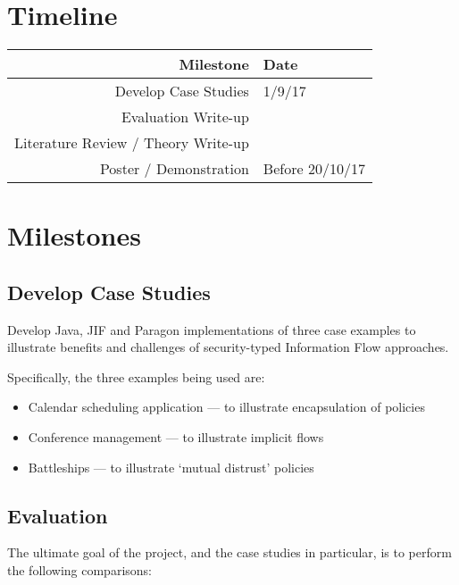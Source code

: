 
\section*{Timeline}

\begin{tabular}{r|l}
	\textbf{Milestone} & \textbf{Date} \\\hline
	Develop Case Studies & 1/9/17 \\\hline
	Evaluation Write-up &  \\\hline
	Literature Review / Theory Write-up &  \\\hline
	Poster / Demonstration & Before 20/10/17 \\
\end{tabular}

\section*{Milestones}

\subsection*{Develop Case Studies}

Develop Java, JIF and Paragon implementations of three case examples to illustrate benefits and challenges of security-typed Information Flow approaches.

Specifically, the three examples being used are:

\begin{itemize}
	\item Calendar scheduling application --- to illustrate encapsulation of policies
	
	\item Conference management --- to illustrate implicit flows
	
	\item Battleships --- to illustrate `mutual distrust' policies
\end{itemize}

\subsection*{Evaluation}

The ultimate goal of the project, and the case studies in particular, is to perform the following comparisons:

